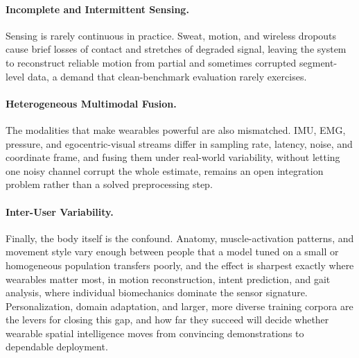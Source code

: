 \paragraph{Incomplete and Intermittent Sensing.}
Sensing is rarely continuous in practice. Sweat, motion, and wireless dropouts cause brief losses of contact and stretches of degraded signal, leaving the system to reconstruct reliable motion from partial and sometimes corrupted segment-level data, a demand that clean-benchmark evaluation rarely exercises.

\paragraph{Heterogeneous Multimodal Fusion.}
The modalities that make wearables powerful are also mismatched. IMU, EMG, pressure, and egocentric-visual streams differ in sampling rate, latency, noise, and coordinate frame, and fusing them under real-world variability, without letting one noisy channel corrupt the whole estimate, remains an open integration problem rather than a solved preprocessing step.

\paragraph{Inter-User Variability.}
Finally, the body itself is the confound. Anatomy, muscle-activation patterns, and movement style vary enough between people that a model tuned on a small or homogeneous population transfers poorly, and the effect is sharpest exactly where wearables matter most, in motion reconstruction, intent prediction, and gait analysis, where individual biomechanics dominate the sensor signature. Personalization, domain adaptation, and larger, more diverse training corpora are the levers for closing this gap, and how far they succeed will decide whether wearable spatial intelligence moves from convincing demonstrations to dependable deployment.
